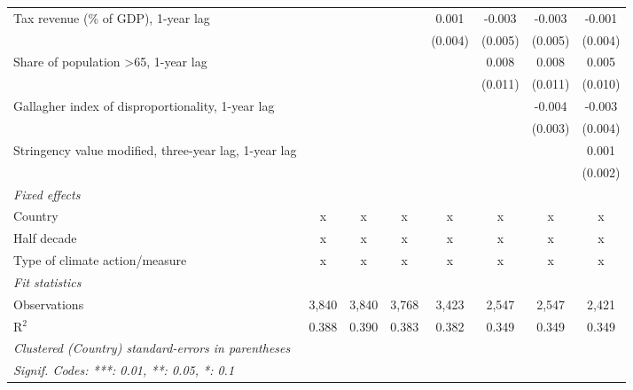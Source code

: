 \begin{tabular}{lccccccc}
   Tax revenue (\% of GDP), 1-year lag                              &               &              &               & 0.001       & -0.003  & -0.003  & -0.001\\   
                                                                    &               &              &               & (0.004)     & (0.005) & (0.005) & (0.004)\\   
   Share of population >65, 1-year lag                              &               &              &               &             & 0.008   & 0.008   & 0.005\\   
                                                                    &               &              &               &             & (0.011) & (0.011) & (0.010)\\   
   Gallagher index of disproportionality, 1-year lag                &               &              &               &             &         & -0.004  & -0.003\\   
                                                                    &               &              &               &             &         & (0.003) & (0.004)\\   
   Stringency value modified, three-year lag, 1-year lag            &               &              &               &             &         &         & 0.001\\   
                                                                    &               &              &               &             &         &         & (0.002)\\   
   \emph{Fixed effects}\\
   Country                                                          & x             & x            & x             & x           & x       & x       & x\\  
   Half decade                                                      & x             & x            & x             & x           & x       & x       & x\\  
   Type of climate action/measure                                   & x             & x            & x             & x           & x       & x       & x\\  
   \midrule \emph{Fit statistics}\\
   Observations                                                     & 3,840         & 3,840        & 3,768         & 3,423       & 2,547   & 2,547   & 2,421\\  
   R$^2$                                                            & 0.388         & 0.390        & 0.383         & 0.382       & 0.349   & 0.349   & 0.349\\  
   \midrule
   \multicolumn{8}{l}{\emph{Clustered (Country) standard-errors in parentheses}}\\
   \multicolumn{8}{l}{\emph{Signif. Codes: ***: 0.01, **: 0.05, *: 0.1}}\\
\end{tabular}
\par\endgroup


